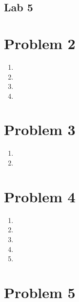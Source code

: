\documentclass[11pt, oneside]{article}   	%
\begin{document}
\begin{center}
\section*{Lab 5}
\end{center}

\begin{flushleft}



\newpage

\section*{Problem 2}

\begin{enumerate}[label=(\alph*)]
    \item %
    \item %
    \item %
    \item %
\end{enumerate}

\newpage

\section*{Problem 3}

\begin{enumerate}[label=(\alph*)]
    \item %
    \item %
\end{enumerate}

\newpage

\section*{Problem 4}

\begin{enumerate}[label=(\alph*)]
    \item %
    \item %
    \item %
    \item %
    \item %
\end{enumerate}

\newpage

\section*{Problem 5}


\end{flushleft}
\end{document}
